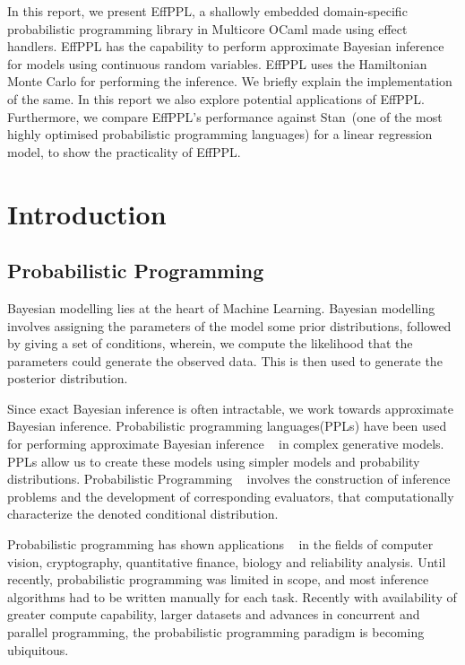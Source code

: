\documentclass[a4paper,11pt]{article}
\theoremstyle{mytheor}
\begin{document}
In this report, we present EffPPL, a shallowly embedded domain-specific probabilistic programming library in Multicore OCaml made using effect handlers. EffPPL has the capability to perform approximate Bayesian inference for models using continuous random variables. EffPPL uses the Hamiltonian Monte Carlo for performing the inference. We briefly explain the implementation of the same. In this report we also explore potential applications of EffPPL. Furthermore, we compare EffPPL's performance against Stan~\cite{stan}(one of the most highly optimised probabilistic programming languages)  for a linear regression model, to show the practicality of EffPPL. 

\section{Introduction}

\subsection{Probabilistic Programming}

Bayesian modelling lies at the heart of Machine Learning. Bayesian modelling involves assigning the parameters of the model some prior distributions, followed by giving a set of conditions, wherein, we compute the likelihood that the parameters could generate the observed data. This is then used to generate the posterior distribution. 

Since exact Bayesian inference is often intractable, we work towards approximate Bayesian inference. Probabilistic programming languages(PPLs) have been used for performing approximate Bayesian inference ~\cite{Baydin_2019} in complex generative models. PPLs allow us to create these models using simpler models and probability distributions. Probabilistic Programming ~\cite{vandemeent2018introduction} involves the construction of inference problems and the development of corresponding evaluators, that computationally characterize the denoted conditional distribution.

Probabilistic programming has shown applications ~\cite{appl} in the fields of computer vision, cryptography, quantitative finance, biology and reliability analysis. Until recently, probabilistic programming was limited in scope, and most inference algorithms had to be written manually for each task. Recently with availability of greater compute capability, larger datasets and advances in concurrent and parallel programming, the probabilistic programming paradigm is becoming ubiquitous. 
\end{document}
